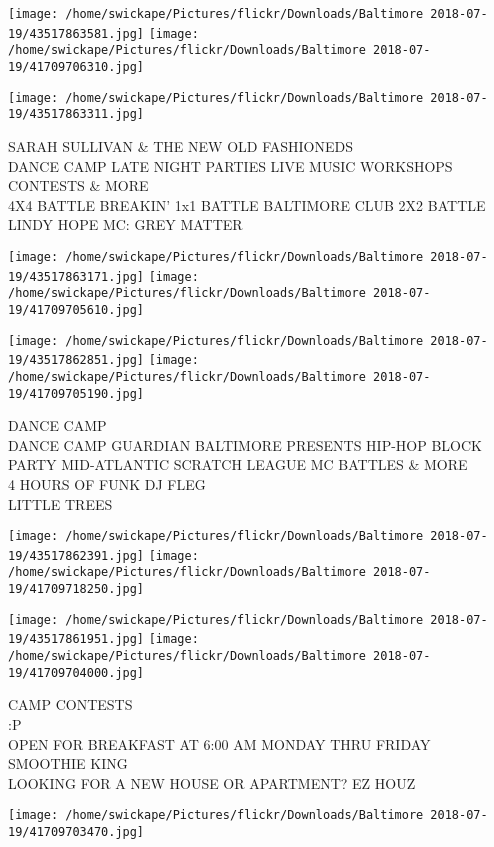 \documentclass[10pt,letterpaper]{article}
\begin{document}
\texttt{[image: /home/swickape/Pictures/flickr/Downloads/Baltimore 2018-07-19/43517863581.jpg]}
\texttt{[image: /home/swickape/Pictures/flickr/Downloads/Baltimore 2018-07-19/41709706310.jpg]}

\vspace{0.25in}
\texttt{[image: /home/swickape/Pictures/flickr/Downloads/Baltimore 2018-07-19/43517863311.jpg]}

SARAH SULLIVAN \& THE NEW OLD FASHIONEDS\\
DANCE CAMP LATE NIGHT PARTIES LIVE MUSIC WORKSHOPS CONTESTS \& MORE\\
4X4 BATTLE BREAKIN' 1x1 BATTLE BALTIMORE CLUB 2X2 BATTLE LINDY HOPE MC: GREY MATTER
\pagebreak

\texttt{[image: /home/swickape/Pictures/flickr/Downloads/Baltimore 2018-07-19/43517863171.jpg]}
\texttt{[image: /home/swickape/Pictures/flickr/Downloads/Baltimore 2018-07-19/41709705610.jpg]}

\texttt{[image: /home/swickape/Pictures/flickr/Downloads/Baltimore 2018-07-19/43517862851.jpg]}
\texttt{[image: /home/swickape/Pictures/flickr/Downloads/Baltimore 2018-07-19/41709705190.jpg]}

DANCE CAMP\\
DANCE CAMP GUARDIAN BALTIMORE PRESENTS HIP{-}HOP BLOCK PARTY MID{-}ATLANTIC SCRATCH LEAGUE MC BATTLES \& MORE\\
4 HOURS OF FUNK DJ FLEG\\
LITTLE TREES
\pagebreak

\texttt{[image: /home/swickape/Pictures/flickr/Downloads/Baltimore 2018-07-19/43517862391.jpg]}
\texttt{[image: /home/swickape/Pictures/flickr/Downloads/Baltimore 2018-07-19/41709718250.jpg]}

\texttt{[image: /home/swickape/Pictures/flickr/Downloads/Baltimore 2018-07-19/43517861951.jpg]}
\texttt{[image: /home/swickape/Pictures/flickr/Downloads/Baltimore 2018-07-19/41709704000.jpg]}

CAMP CONTESTS\\
:P\\
OPEN FOR BREAKFAST AT 6:00 AM MONDAY THRU FRIDAY SMOOTHIE KING\\
LOOKING FOR A NEW HOUSE OR APARTMENT?  EZ HOUZ
\pagebreak

\texttt{[image: /home/swickape/Pictures/flickr/Downloads/Baltimore 2018-07-19/41709703470.jpg]}
\end{document}
